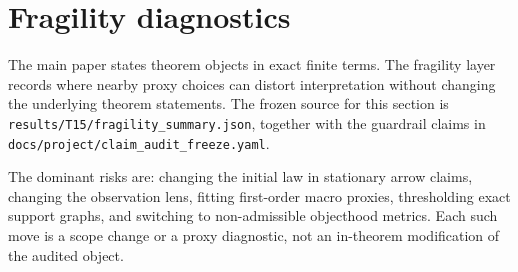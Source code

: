 \section{Fragility diagnostics}
The main paper states theorem objects in exact finite terms.
The fragility layer records where nearby proxy choices can distort interpretation without changing the underlying theorem statements.
The frozen source for this section is \texttt{results/T15/fragility\_summary.json}, together with the guardrail claims in \texttt{docs/project/claim\_audit\_freeze.yaml}.

The dominant risks are: changing the initial law in stationary arrow claims, changing the observation lens, fitting first-order macro proxies, thresholding exact support graphs, and switching to non-admissible objecthood metrics.
Each such move is a scope change or a proxy diagnostic, not an in-theorem modification of the audited object.


